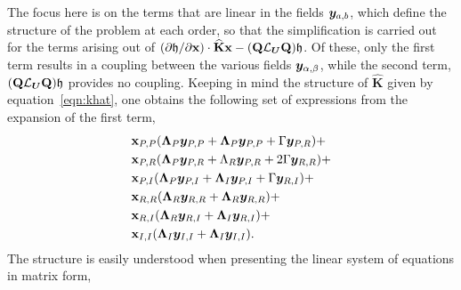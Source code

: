 The focus here is on the terms that are linear in the fields $\boldsymbol{y}_{a,b}$, which define the structure of the problem at each order, so that the simplification is carried out for the terms arising out of $(\partial \mathfrak{h}/\partial \mathbf{x})\cdot \mathbf{\widehat{K}}\mathbf{x} - (\mathbf{Q}\mathcal{L}_{\boldsymbol{U}}\mathbf{Q})\mathfrak{h}$. Of these, only the first term results in a coupling between the various fields $\boldsymbol{y}_{\alpha,\beta}$, while the second term, $(\mathbf{Q}\mathcal{L}_{\boldsymbol{U}}\mathbf{Q})\mathfrak{h}$ provides no coupling. Keeping in mind the structure of $\mathbf{\widehat{K}}$ given by equation~\eqref{eqn:khat}, one obtains the following set of expressions from the expansion of the first term,
\begin{align}
	\begin{split}
		&\mathbf{x}_{P,P}(\mathbf{\Lambda}_{P}\boldsymbol{y}_{P,P} + \mathbf{\Lambda}_{P}\boldsymbol{y}_{P,P} + \Gamma\boldsymbol{y}_{P,R}) + \\
		&\mathbf{x}_{P,R}(\mathbf{\Lambda}_{P}\boldsymbol{y}_{P,R} + \Lambda_{R}\boldsymbol{y}_{P,R} + 2\Gamma\boldsymbol{y}_{R,R}) + \\
		&\mathbf{x}_{P,I}(\mathbf{\Lambda}_{P}\boldsymbol{y}_{P,I} + \mathbf{\Lambda}_{I}\boldsymbol{y}_{P,I} + \Gamma\boldsymbol{y}_{R,I}) + \\
		& \mathbf{x}_{R,R}(\mathbf{\Lambda}_{R}\boldsymbol{y}_{R,R} + \mathbf{\Lambda}_{R}\boldsymbol{y}_{R,R}) + \\
		& \mathbf{x}_{R,I}(\mathbf{\Lambda}_{R}\boldsymbol{y}_{R,I} + \mathbf{\Lambda}_{I}\boldsymbol{y}_{R,I}) + \\
		& \mathbf{x}_{I,I}(\mathbf{\Lambda}_{I}\boldsymbol{y}_{I,I} + \mathbf{\Lambda}_{I}\boldsymbol{y}_{I,I}).
	\end{split}
\end{align}
The structure is easily understood when presenting the linear system of equations in matrix form,
